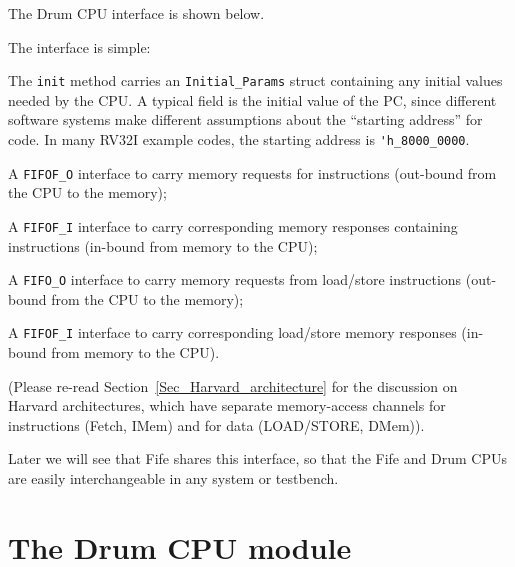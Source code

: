 \label{Sec_Drum_CPU_interface}


The Drum CPU interface is shown below.


The interface is simple:

\begin{tightlist}

  \item The \verb|init| method carries an \verb|Initial_Params| struct
    containing any initial values needed by the CPU.  A typical field
    is the initial value of the PC, since different software systems
    make different assumptions about the ``starting address'' for
    code.  In many RV32I example codes, the starting address is
    \verb|'h_8000_0000|.

  \item A \verb|FIFOF_O| interface to carry memory requests for
    instructions (out-bound from the CPU to the memory);

  \item A \verb|FIFOF_I| interface to carry corresponding memory
    responses containing instructions (in-bound from memory to the
    CPU);

  \item A \verb|FIFO_O| interface to carry memory requests from
    load/store instructions (out-bound from the CPU to the memory);

  \item A \verb|FIFOF_I| interface to carry corresponding load/store
    memory responses (in-bound from memory to the CPU).

\end{tightlist}

(Please re-read Section~\ref{Sec_Harvard_architecture} for the
discussion on Harvard architectures, which have separate memory-access
channels for instructions (Fetch, IMem) and for data (LOAD/STORE,
DMem)).

Later we will see that Fife shares this interface, so that the Fife
and Drum CPUs are easily interchangeable in any system or testbench.


\section{The Drum CPU module}

